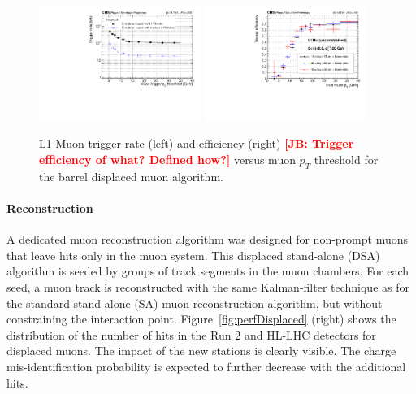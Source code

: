 \begin{figure}[t]
\begin{center}
  \includegraphics[width=0.47\textwidth]{figures/cmsupgrade/TDR-17-003_fig_7_11_a_Prompt_L1Mu_trigger_rate_pt__L1Mu__L1Mu2st__DisplacedL1MuDirectionBased_MB1_MB2_MB3_MB4_combined_eta0to0p9.pdf} \hfill
  \includegraphics[width=0.47\textwidth]{figures/cmsupgrade/TDR-17-003_fig_7_11_b_L1MuonTDR2017Displaced_L1MuPt20_SimMuPt_DT1_DT2_DT3_DT4_combined_eta0to0p9_dxy5to50_looseVeto.pdf}
  \caption{L1 Muon trigger rate (left) and efficiency (right) {\bf \textcolor{red}{[JB: Trigger efficiency of what?  Defined how?]}} versus muon $p_T$ threshold for the barrel displaced muon algorithm.}
  \label{fig:cmsL1mu}
\end{center}
\end{figure}


\paragraph{Reconstruction}

A dedicated muon reconstruction algorithm was designed for non-prompt muons that leave hits only in the muon system. This displaced stand-alone (DSA) algorithm is seeded by groups of track segments in the muon chambers. For each seed, a muon track is reconstructed with the same Kalman-filter technique as for the standard stand-alone (SA) muon reconstruction algorithm, but without constraining the interaction point. Figure~\ref{fig:perfDisplaced} (right) shows the distribution of the number of hits in the Run 2 and HL-LHC detectors for displaced muons. The impact of the new stations is clearly visible. The charge mis-identification probability is expected to further decrease with the additional hits.

